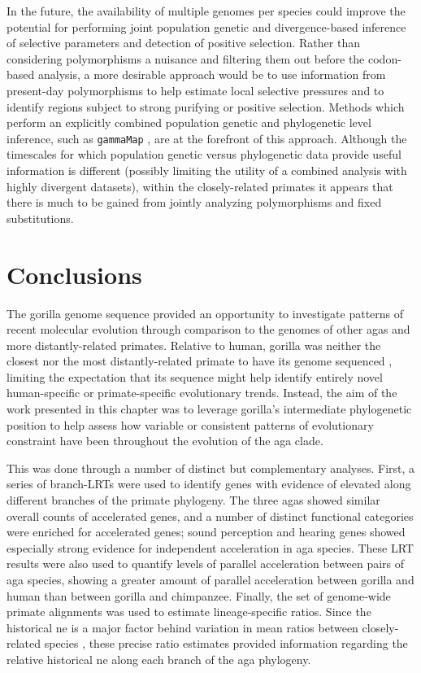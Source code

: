 In the future, the availability of multiple genomes per species could
improve the potential for performing joint population genetic and
divergence-based inference of selective parameters and detection of
positive selection. Rather than considering polymorphisms a nuisance
and filtering them out before the codon-based analysis, a more
desirable approach would be to use information from present-day
polymorphisms to help estimate local selective pressures and to
identify regions subject to strong purifying or positive
selection. Methods which perform an explicitly combined population
genetic and phylogenetic level inference, such as \texttt{gammaMap}
\citep{Wilson2011}, are at the forefront of this approach. Although
the timescales for which population genetic versus phylogenetic data
provide useful information is different (possibly limiting the utility
of a combined analysis with highly divergent datasets), within the
closely-related primates it appears that there is much to be gained
from jointly analyzing polymorphisms and fixed substitutions.


\section{Conclusions}

The gorilla genome sequence provided an opportunity to investigate
patterns of recent molecular evolution through comparison to the
genomes of other \acp{aga} and more distantly-related
primates. Relative to human, gorilla was neither the closest
\citep{Sequencing2005a} nor the most distantly-related primate to have
its genome sequenced \citep{Macaque2007,Locke2011}, limiting the
expectation that its sequence might help identify entirely novel
human-specific or primate-specific evolutionary trends. Instead, the
aim of the work presented in this chapter was to leverage gorilla's
intermediate phylogenetic position to help assess how variable or
consistent patterns of evolutionary constraint have been throughout
the evolution of the \ac{aga} clade.

This was done through a number of distinct but complementary
analyses. First, a series of branch-LRTs were used to identify genes
with evidence of elevated \dnds along different branches of the
primate phylogeny. The three \acp{aga} showed similar overall counts
of accelerated genes, and a number of distinct functional categories
were enriched for accelerated genes; sound perception and hearing
genes showed especially strong evidence for independent acceleration
in \ac{aga} species. These LRT results were also used to quantify
levels of parallel acceleration between pairs of \ac{aga} species,
showing a greater amount of parallel acceleration between gorilla and
human than between gorilla and chimpanzee. Finally, the set of
genome-wide primate alignments was used to estimate lineage-specific
\dnds ratios. Since the historical \acf{ne} is a major factor behind
variation in mean \dnds ratios between closely-related species
\citep{Kosiol2008,Ellegren2009}, these precise \dnds ratio estimates
provided information regarding the relative historical \ac{ne} along
each branch of the \ac{aga} phylogeny.

